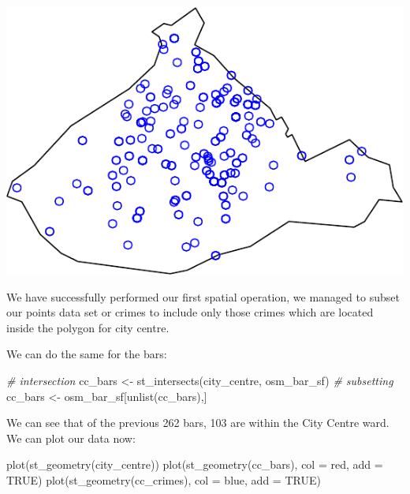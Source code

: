 \documentclass[
  krantz2]{krantz}
\makeatletter
\newenvironment{Shaded}{\begin{snugshade}}{\end{snugshade}}
\newcommand{\AttributeTok}[1]{\textcolor[rgb]{0.61,0.61,0.61}{#1}}
\newcommand{\CommentTok}[1]{\textcolor[rgb]{0.37,0.37,0.37}{\textit{#1}}}
\newcommand{\ConstantTok}[1]{\textcolor[rgb]{0,0,0}{#1}}
\newcommand{\FunctionTok}[1]{\textcolor[rgb]{0,0,0}{#1}}
\newcommand{\NormalTok}[1]{#1}
\newcommand{\OtherTok}[1]{\textcolor[rgb]{0.37,0.37,0.37}{#1}}
\newcommand{\StringTok}[1]{\textcolor[rgb]{0.5,0.5,0.5}{#1}}
\newenvironment{kframe}{%
\medskip{}
\setlength{\fboxsep}{.8em}
 \def\at@end@of@kframe{}%
 \ifinner\ifhmode%
  \def\at@end@of@kframe{\end{minipage}}%
  \begin{minipage}{\columnwidth}%
 \fi\fi%
 \def\FrameCommand##1{\hskip\@totalleftmargin \hskip-\fboxsep
 \colorbox{shadecolor}{##1}\hskip-\fboxsep
     \hskip-\linewidth \hskip-\@totalleftmargin \hskip\columnwidth}%
 \MakeFramed {\advance\hsize-\width
   \@totalleftmargin\z@ \linewidth\hsize
   \@setminipage}}%
 {\par\unskip\endMakeFramed%
 \at@end@of@kframe}
\renewenvironment{Shaded}{\begin{kframe}}{\end{kframe}}
\makeatother
\begin{document}
\includegraphics{crime_mapping_files/figure-latex/plot_crimes_ccentre-1.pdf}

We have successfully performed our first spatial operation, we managed to subset our points data set or crimes to include only those crimes which are located inside the polygon for city centre.

We can do the same for the bars:

\begin{Shaded}
\begin{Highlighting}[]
\CommentTok{\# intersection}
\NormalTok{cc\_bars }\OtherTok{\textless{}{-}} \FunctionTok{st\_intersects}\NormalTok{(city\_centre, osm\_bar\_sf)}
\CommentTok{\# subsetting}
\NormalTok{cc\_bars }\OtherTok{\textless{}{-}}\NormalTok{ osm\_bar\_sf[}\FunctionTok{unlist}\NormalTok{(cc\_bars),]}
\end{Highlighting}
\end{Shaded}

We can see that of the previous 262 bars, 103 are within the City Centre ward. We can plot our data now:

\begin{Shaded}
\begin{Highlighting}[]
\FunctionTok{plot}\NormalTok{(}\FunctionTok{st\_geometry}\NormalTok{(city\_centre))}
\FunctionTok{plot}\NormalTok{(}\FunctionTok{st\_geometry}\NormalTok{(cc\_bars), }\AttributeTok{col =} \StringTok{\textquotesingle{}red\textquotesingle{}}\NormalTok{, }\AttributeTok{add =} \ConstantTok{TRUE}\NormalTok{)}
\FunctionTok{plot}\NormalTok{(}\FunctionTok{st\_geometry}\NormalTok{(cc\_crimes), }\AttributeTok{col =} \StringTok{\textquotesingle{}blue\textquotesingle{}}\NormalTok{, }\AttributeTok{add =} \ConstantTok{TRUE}\NormalTok{)}
\end{Highlighting}
\end{Shaded}
\end{document}
